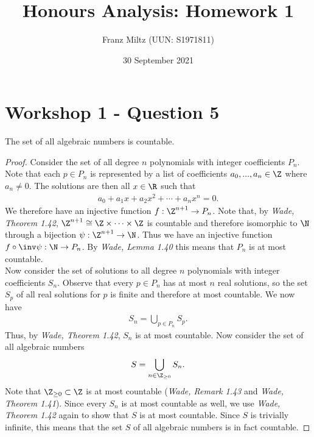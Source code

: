 \documentclass{article}
\begin{document}
\title{Honours Analysis: Homework 1}
\author{Franz Miltz (UUN: S1971811)}
\date{30 September 2021}
\maketitle

\section{Workshop 1 - Question 5}

\begin{claim}
   The set of all algebraic numbers is countable.
   \begin{proof}
      Consider the set of all degree $n$ polynomials with integer coefficients $P_n$.
      Note that each $p\in P_n$ is represented by a list of coefficients
      $a_0, ..., a_n\in\Z$ where $a_n\not=0$. The solutions are then all $x\in\R$
      such that
      \begin{align*}
         a_0 + a_1 x + a_2 x^2 + \cdots + a_n x^n = 0.
      \end{align*}
      We therefore have an injective function $f:\Z^{n+1}\to P_n$.
      Note that, by \emph{Wade, Theorem 1.42}, $\Z^{n+1}\cong \Z \times \cdots \times \Z$ is countable and therefore isomorphic to $\N$
      through a bijection $\psi:\Z^{n+1}\to\N$. Thus we have an injective
      function $f\circ\inv\psi:\N\to P_n$.
      By \emph{Wade, Lemma 1.40} this means that $P_n$ is at most countable.\\
      Now consider the set of solutions to all degree $n$ polynomials with
      integer coefficients $S_n$. Observe that every $p\in P_n$ has at most
      $n$ real solutions, so the set $S_p$ of all real solutions for $p$ is
      finite and therefore at most countable.
      We now have
      \begin{align*}
         S_n = \bigcup_{p\in P_n} S_p.
      \end{align*}
      Thus, by \emph{Wade, Theorem 1.42}, $S_n$ is at most countable.
      Now consider the set of all algebraic numbers
      \begin{align*}
         S = \bigcup_{n\in\Z_{\geq 0}}S_n.
      \end{align*}
      Note that $\Z_{\geq 0}\subset \Z$ is at most countable
      (\emph{Wade, Remark 1.43} and \emph{Wade, Theorem 1.41}). Since
      every $S_n$ is at most countable as well, we use \emph{Wade, Theorem 1.42}
      again to show that $S$ is at most countable.
      Since $S$ is trivially infinite, this means that the set $S$ of
      all algebraic numbers is in fact countable.
   \end{proof}
\end{claim}
\end{document}
